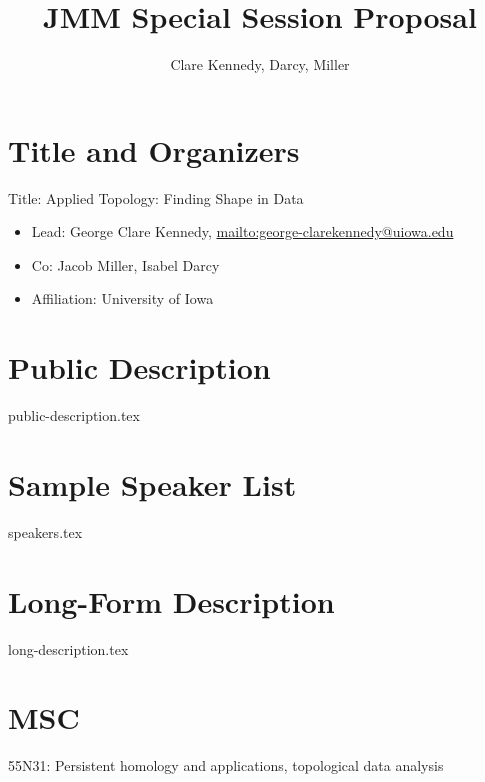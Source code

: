 \documentclass{article}
\title{JMM Special Session Proposal}
\author{Clare Kennedy, Darcy, Miller}
\date{}
\begin{document}
\maketitle

\section{Title and Organizers}

Title: Applied Topology: Finding Shape in Data

\begin{itemize}
    \item Lead: George Clare Kennedy, \url{mailto:george-clarekennedy@uiowa.edu}
    \item Co: Jacob Miller, Isabel Darcy
    \item Affiliation: University of Iowa
\end{itemize}

\section{Public Description}
{public-description.tex}

\section{Sample Speaker List}
{speakers.tex}

\section{Long-Form Description}
{long-description.tex}

\section{MSC}

55N31: Persistent homology and applications, topological data analysis
\end{document}
